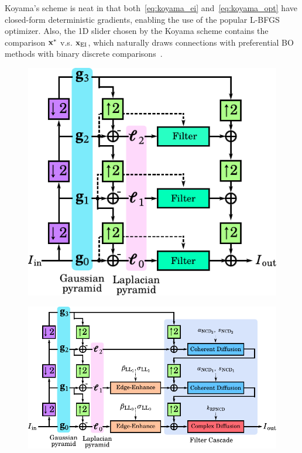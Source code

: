 Koyama's scheme is neat in that both~\cref{eq:koyama_ei} and~\cref{eq:koyama_opt} have closed-form deterministic gradients, enabling the use of the popular L-BFGS~\cite{liu_limited_1989} optimizer.
Also, the 1D slider chosen by the Koyama scheme contains the comparison \(\mathbf{x}^*\) v.s. \(\mathbf{x}_{\mathrm{EI}}\), which naturally draws connections with preferential BO methods with binary discrete comparisons~\cite{NIPS2007_b6a1085a}.


\begin{figure}
  \vspace{-0.1in}
  \centering
  \begin{minipage}[c]{0.43\textwidth}
    \centering
    \includegraphics[scale=0.70]{figures/conventional_laplacian_pyramid.pdf}
    \label{fig:lpnd}
  \end{minipage}
  \begin{minipage}[c]{0.53\textwidth}
    \centering
    \includegraphics[scale=0.70]{figures/multiscale_filter.pdf}

\end{minipage}
\end{figure}
